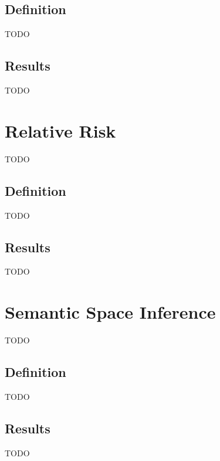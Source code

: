 \subsection{Definition}
TODO

\subsection{Results}
TODO

\section{Relative Risk}
TODO

\subsection{Definition}
TODO

\subsection{Results}
TODO

\section{Semantic Space Inference}
TODO

\subsection{Definition}
TODO

\subsection{Results}
TODO